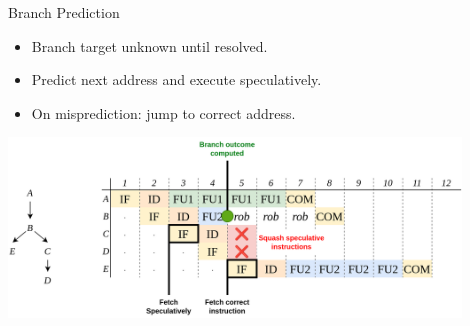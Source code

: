 \documentclass{beamer}
\begin{document}
\begin{frame}{Branch Prediction}
    
    \begin{itemize}
        \item Branch target unknown until resolved.
        \item Predict next address and execute speculatively.
        \item On misprediction: jump to correct address.
    \end{itemize}

    
    \includegraphics[width=0.9\textwidth]{pic/bp-demo.png}

\end{frame}

\end{document}
